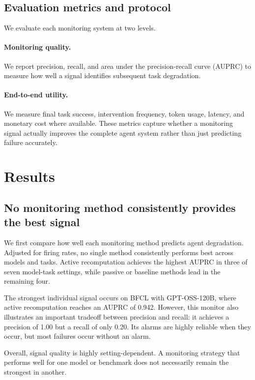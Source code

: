 \documentclass{article}
\begin{document}
\subsection{Evaluation metrics and protocol}

We evaluate each monitoring system at two levels.

\paragraph{Monitoring quality.}
We report precision, recall, and area under the precision-recall curve (AUPRC) to measure how well a signal identifies subsequent task degradation.

\paragraph{End-to-end utility.}
We measure final task success, intervention frequency, token usage, latency, and monetary cost where available. These metrics capture whether a monitoring signal actually improves the complete agent system rather than just predicting failure accurately.

\section{Results}

\subsection{No monitoring method consistently provides the best signal}

We first compare how well each monitoring method predicts agent degradation. Adjusted for firing rates, no single method consistently performs best across models and tasks. Active recomputation achieves the highest AUPRC in three of seven model-task settings, while passive or baseline methods lead in the remaining four.

The strongest individual signal occurs on BFCL with GPT-OSS-120B, where active recomputation reaches an AUPRC of 0.942. However, this monitor also illustrates an important tradeoff between precision and recall: it achieves a precision of 1.00 but a recall of only 0.20. Its alarms are highly reliable when they occur, but most failures occur without an alarm.

Overall, signal quality is highly setting-dependent. A monitoring strategy that performs well for one model or benchmark does not necessarily remain the strongest in another.
\end{document}
